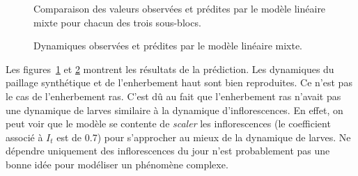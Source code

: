 \documentclass[a4paper, 11pt]{article}
\begin{document}
\begin{table}[ht]
\end{table}

\begin{figure}[ht]
 \centering
 \caption{Comparaison des valeurs observées et prédites par le modèle linéaire mixte pour chacun des trois sous-blocs.}
 \label{fig:mmls}
\end{figure}

\begin{figure}[ht]
 \centering
 \caption{Dynamiques observées et prédites par le modèle linéaire mixte.}
 \label{fig:mml}
\end{figure}

Les figures~\ref{fig:mmls} et \ref{fig:mml} montrent les résultats de la prédiction. Les dynamiques du paillage synthétique et de l'enherbement haut sont bien reproduites. Ce n'est pas le cas de l'enherbement ras. C'est dû au fait que l'enherbement ras n'avait pas une dynamique de larves similaire à la dynamique d'inflorescences. En effet, on peut voir que le modèle se contente de \emph{scaler} les inflorescences (le coefficient associé à $I_t$ est de 0.7) pour s'approcher au mieux de la dynamique de larves. Ne dépendre uniquement des inflorescences du jour n'est probablement pas une bonne idée pour modéliser un phénomène complexe.
\end{document}

